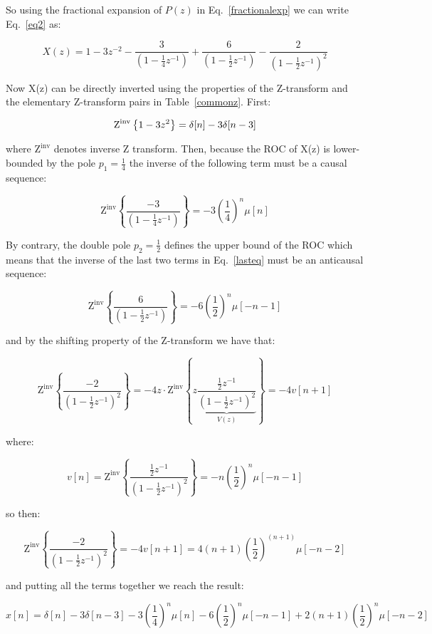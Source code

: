 \documentclass[a4paper,11pt,oneside]{article}
\begin{document}
So using the fractional expansion of $P(z)$ in Eq.~\ref{fractionalexp} we can write Eq.~\ref{eq2} as:


\begin{equation}\label{lasteq}
X(z)=1-3z^{-2}-\frac{3}{(1-\frac{1}{4}z^{-1})}+\frac{6}{(1-\frac{1}{2}z^{-1})}-\frac{2}{(1-\frac{1}{2}z^{-1})^2}
\end{equation}

Now X(z) can be directly inverted using the properties of the Z-transform and the elementary Z-transform pairs in Table~\ref{commonz}. First:

\[
\textrm{Z}^{\textrm{inv}}\left\{1-3z^{2}\right\}=\delta[n]-3\delta[n-3]\\
\]

where $\textrm{Z}^{\textrm{inv}}$ denotes inverse Z transform. Then, because the ROC of X(z) is lower-bounded by the pole $p_1=\frac{1}{4}$ the inverse of the following term must be a causal sequence:

\[
\textrm{Z}^{\textrm{inv}}\left\{\frac{-3}{(1-\frac{1}{4}z^{-1})}\right\}=-3\left(\frac{1}{4}\right)^n\mu[n]
\]

By contrary, the double pole $p_2=\frac{1}{2}$ defines the upper bound of the ROC which means that the inverse of the last two terms in Eq.~\ref{lasteq} must be an anticausal sequence:

\[
\textrm{Z}^{\textrm{inv}}\left\{\frac{6}{(1-\frac{1}{2}z^{-1})}\right\}=-6\left(\frac{1}{2}\right)^n\mu[-n-1]
\]

and by the shifting property of the Z-transform we have that:

\[
\textrm{Z}^{\textrm{inv}}\left\{\frac{-2}{(1-\frac{1}{2}z^{-1})^2}\right\}=-4 z\cdot \textrm{Z}^{\textrm{inv}}\left\{z\underbrace{\frac{\frac{1}{2}z^{-1}}{(1-\frac{1}{2}z^{-1})^2}}_{V(z)}\right\}=-4v[n+1]
\]

where:

\[
v[n] =  \textrm{Z}^{\textrm{inv}}\left\{\frac{\frac{1}{2}z^{-1}}{(1-\frac{1}{2}z^{-1})^2}\right\}=-n\left(\frac{1}{2}\right)^n\mu[-n-1]
\]

so then:

\[
\textrm{Z}^{\textrm{inv}}\left\{\frac{-2}{(1-\frac{1}{2}z^{-1})^2}\right\}=-4v[n+1]=4(n+1)\left(\frac{1}{2}\right)^{(n+1)}\mu[-n-2]
\]

and putting all the terms together we reach the result:

\[
x[n] =\delta[n]-3\delta[n-3]-3\left(\frac{1}{4}\right)^n\mu[n]-6\left(\frac{1}{2}\right)^n\mu[-n-1]+2(n+1)\left(\frac{1}{2}\right)^{n}\mu[-n-2]
\]
\end{document}
